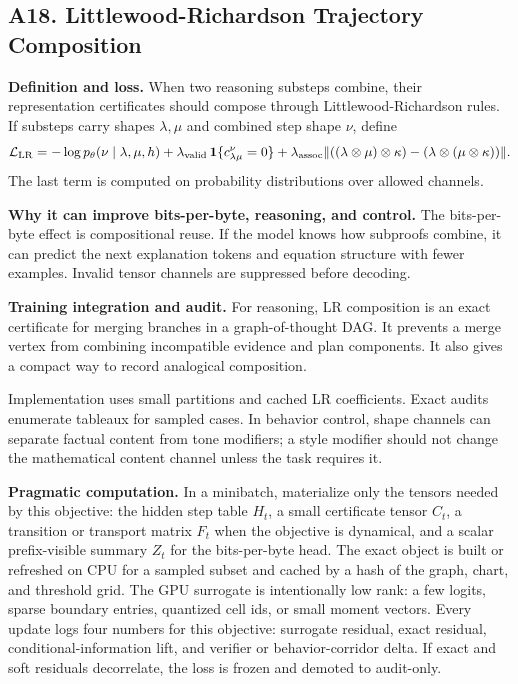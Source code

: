 \documentclass[10pt]{article}
\newcommand{\loss}{\mathcal{L}}
\numberwithin{equation}{section}
\begin{document}
\subsection{A18. Littlewood-Richardson Trajectory Composition}
\noindent\textbf{Definition and loss.} When two reasoning substeps combine, their representation certificates should compose through Littlewood-Richardson rules. If substeps carry shapes $\lambda,\mu$ and combined step shape $\nu$, define
\[
\loss_{\rm LR}=-\log p_\theta(\nu\mid\lambda,\mu,h)+\lambda_{\rm valid}\,\mathbf 1\{c^\nu_{\lambda\mu}=0\}+\lambda_{\rm assoc}\|((\lambda\otimes\mu)\otimes\kappa)-(\lambda\otimes(\mu\otimes\kappa))\|.
\]
The last term is computed on probability distributions over allowed channels.

\noindent\textbf{Why it can improve bits-per-byte, reasoning, and control.} The bits-per-byte effect is compositional reuse. If the model knows how subproofs combine, it can predict the next explanation tokens and equation structure with fewer examples. Invalid tensor channels are suppressed before decoding.

\noindent\textbf{Training integration and audit.} For reasoning, LR composition is an exact certificate for merging branches in a graph-of-thought DAG. It prevents a merge vertex from combining incompatible evidence and plan components. It also gives a compact way to record analogical composition.

Implementation uses small partitions and cached LR coefficients. Exact audits enumerate tableaux for sampled cases. In behavior control, shape channels can separate factual content from tone modifiers; a style modifier should not change the mathematical content channel unless the task requires it.

\noindent\textbf{Pragmatic computation.} In a minibatch, materialize only the tensors needed by this objective: the hidden step table $H_t$, a small certificate tensor $C_t$, a transition or transport matrix $F_t$ when the objective is dynamical, and a scalar prefix-visible summary $Z_t$ for the bits-per-byte head. The exact object is built or refreshed on CPU for a sampled subset and cached by a hash of the graph, chart, and threshold grid. The GPU surrogate is intentionally low rank: a few logits, sparse boundary entries, quantized cell ids, or small moment vectors. Every update logs four numbers for this objective: surrogate residual, exact residual, conditional-information lift, and verifier or behavior-corridor delta. If exact and soft residuals decorrelate, the loss is frozen and demoted to audit-only.
\end{document}
